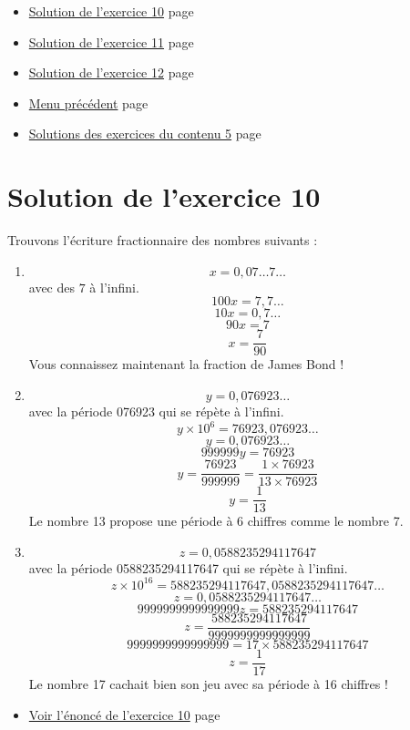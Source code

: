 \documentclass[a4paper,11pt]{book}
\begin{document}
\clearpage

\label{org2ca521c}
\label{page:sols-cont6-menu}
\begin{itemize}
\item \hyperref[orgb898032]{Solution de l'exercice 10} page \pageref{page:sec8.6.1sol10}
\item \hyperref[orgc0eae64]{Solution de l'exercice 11} page \pageref{page:sec8.6.2sol11}
\item \hyperref[org86d02ad]{Solution de l'exercice 12} page \pageref{page:sec8.6.3sol12}
\item \hyperref[orgd150cd0]{Menu précédent} page \pageref{page:sols-contents-menu}
\item \hyperref[orge89e966]{Solutions des exercices du contenu 5} page
\pageref{page:sec8.5sols-cont5}
\end{itemize}


\clearpage

\section{Solution de l'exercice 10}
\label{sec:orgf428682}
\label{orgb898032}
\label{page:sec8.6.1sol10}

Trouvons l'écriture fractionnaire des nombres suivants :

\begin{enumerate}
\item \[x = 0,07\dots7\dots\] avec des \(7\) à l'infini.
\[100x = 7,7\dots\]
\[10x  = 0,7\dots\]
\[90x = 7\]
\[x = \dfrac{7}{90}\]
Vous connaissez maintenant la fraction de James Bond !
\item \[y = 0,076923\dots\] avec la période 076923 qui se répète à l'infini.
\[y \times 10^6 = 76923,076923\dots\]
\[y  = 0,076923\dots\]
\[999999y = 76923\]
\[y = \dfrac{76923}{999999} = \dfrac{1\times 76923}{13\times 76923} \]
\[y = \dfrac{1}{13}\]
Le nombre 13 propose une période à 6 chiffres comme le nombre 7.
\item \[z = 0,0588235294117647\] avec la période 0588235294117647 qui se
répète à l'infini.
\[z\times 10^{16} = 588235294117647,0588235294117647\dots\]
\[z  = 0,0588235294117647\dots\]
\[9999999999999999z = 588235294117647\]
\[z = \dfrac{588235294117647}{9999999999999999}\]
\[9999999999999999 = 17\times 588235294117647 \]
\[z = \dfrac{1}{17}\]
Le nombre 17 cachait bien son jeu avec sa période à 16 chiffres !
\end{enumerate}


\begin{itemize}
\item \hyperref[org76d4ecb]{Voir l'énoncé de l'exercice 10}
page~\pageref{page:sec2.6.2exo10}
\end{itemize}
\end{document}
